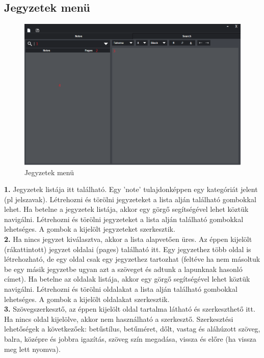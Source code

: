 \subsection{Jegyzetek menü}

\begin{figure}[h]
	\centering
	\includegraphics[scale=0.7]{images/menu_3.png}
	\caption{Jegyzetek menü}
	\label{fig:menu_notes}
\end{figure}

\vspace{5pt} \noindent \textbf{1.} Jegyzetek listája itt található. Egy ’note’ tulajdonképpen egy kategóriát jelent (pl jelszavak). Létrehozni és törölni jegyzeteket a lista alján található gombokkal lehet. Ha betelne a jegyzetek listája, akkor egy görgő segítségével lehet köztük navigálni. Létrehozni és törölni jegyzeteket a lista alján található gombokkal lehetséges. A gombok a kijelölt jegyzeteket szerkesztik.
\vspace{5pt} \\ \textbf{2.} Ha nincs jegyzet kiválasztva, akkor a lista alapvetően üres. Az éppen kijelölt (rákattintott) jegyzet oldalai (pages) található itt. Egy jegyzethez több oldal is létrehozható, de egy oldal csak egy jegyzethez tartozhat (feltéve ha nem másoltuk be egy másik jegyzetbe ugyan azt a szöveget és adtunk a lapunknak hasonló címet). Ha betelne az oldalak listája, akkor egy görgő segítségével lehet köztük navigálni. Létrehozni és törölni oldalakat a lista alján található gombokkal lehetséges. A gombok a kijelölt oldalakat szerkesztik.
\vspace{5pt} \\ \textbf{3.} Szövegszerkesztő, az éppen kijelölt oldal tartalma látható és szerkeszthető itt. Ha nincs oldal kijelölve, akkor nem használható a szerkesztő. Szerkesztési lehetőségek a következőek: betűstílus, betűméret, dőlt, vastag és aláhúzott szöveg, balra, középre és jobbra igazítás, szöveg szín megadása, vissza és előre (ha vissza meg lett nyomva).

